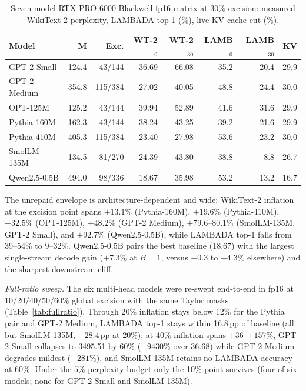 \documentclass[10pt,journal,compsoc]{IEEEtran}
\begin{document}
\begin{table}[!t]
\caption{Seven-model RTX PRO 6000 Blackwell fp16 matrix at 30\%-excision:
measured WikiText-2 perplexity, LAMBADA top-1 (\%), live KV-cache cut (\%).}
\label{tab:gpumatrix}
\centering
\scriptsize
\setlength{\tabcolsep}{1.6pt}
\begin{tabular}{lrrrrrrr}
\toprule
Model & M & Exc. & WT-2$_{0}$ & WT-2$_{30}$ & LAMB$_{0}$ & LAMB$_{30}$ & KV \\
\midrule
GPT-2 Small & 124.4 & 43/144 & 36.69 & 66.08 & 35.2 & 20.4 & 29.9 \\
GPT-2 Medium & 354.8 & 115/384 & 27.02 & 40.05 & 48.8 & 24.4 & 30.0 \\
OPT-125M & 125.2 & 43/144 & 39.94 & 52.89 & 41.6 & 31.6 & 29.9 \\
Pythia-160M & 162.3 & 43/144 & 38.24 & 43.25 & 39.2 & 21.6 & 29.9 \\
Pythia-410M & 405.3 & 115/384 & 23.40 & 27.98 & 53.6 & 23.2 & 30.0 \\
SmolLM-135M & 134.5 & 81/270 & 24.39 & 43.80 & 38.8 & 8.8 & 26.7 \\
Qwen2.5-0.5B & 494.0 & 98/336 & 18.67 & 35.98 & 53.2 & 13.2 & 16.7 \\
\bottomrule
\end{tabular}
\end{table}

The unrepaid envelope is architecture-dependent and wide: WikiText-2 inflation
at the excision point spans $+13.1\%$ (Pythia-160M), $+19.6\%$ (Pythia-410M),
$+32.5\%$ (OPT-125M), $+48.2\%$ (GPT-2 Medium), $+79.6$--$80.1\%$ (SmolLM-135M,
GPT-2 Small), and $+92.7\%$ (Qwen2.5-0.5B), while LAMBADA top-1 falls from
39--54\% to 9--32\%. Qwen2.5-0.5B pairs the best baseline (18.67) with the
largest single-stream decode gain ($+7.3\%$ at $B{=}1$, versus $+0.3$ to
$+4.3\%$ elsewhere) and the sharpest downstream cliff.

\emph{Full-ratio sweep.} The six multi-head models were re-swept end-to-end in
fp16 at 10/20/40/50/60\% global excision with the same Taylor masks
(Table~\ref{tab:fullratio}). Through 20\% inflation stays below 12\% for the
Pythia pair and GPT-2 Medium, LAMBADA top-1 stays within 16.8\,pp of baseline
(all but SmolLM-135M, $-28.4$\,pp at 20\%); at 40\% inflation spans
$+36$--$+157\%$, GPT-2 Small collapses to 3495.51 by 60\% ($+9430\%$ over
36.68) while GPT-2 Medium degrades mildest ($+281\%$), and SmolLM-135M retains
no LAMBADA accuracy at 60\%. Under the $5\%$ perplexity budget only the 10\%
point survives (four of six models; none for GPT-2 Small and SmolLM-135M).
\end{document}
